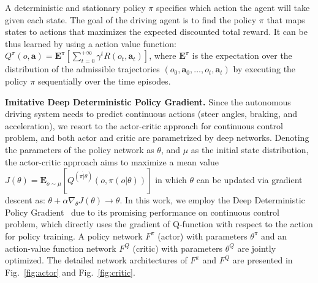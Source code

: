\documentclass[runningheads]{llncs}
\begin{document}
A deterministic and stationary policy $\pi$ specifies which action the agent will take given each state. The goal of the driving agent is to find the policy $\pi$ that maps states to actions that maximizes the expected discounted total reward. It can be thus learned by using a action value function: $Q^\pi(o,\mathbf{a}) = \mathbf{E}^\pi[\sum_{t=0}^{+\infty}\gamma^tR(o_t, \mathbf{a}_t)]$, where $\mathbf{E}^\pi$ is the expectation over the distribution of the admissible trajectories $(o_0, \mathbf{a}_0, \dots, o_t, \mathbf{a}_t)$ by executing the policy $\pi$ sequentially over the time episodes.

\noindent\textbf{Imitative Deep Deterministic Policy Gradient.} Since the autonomous driving system needs to predict continuous actions (steer angles, braking, and acceleration), we resort to the actor-critic approach for continuous control problem, and both actor and critic are parametrized by deep networks. Denoting the parameters of the policy network as $\theta$, and $\mu$ as the initial state distribution, the actor-critic approach aims to maximize a mean value $J(\theta) =\mathbf{E}_{o\sim \mu}[Q^{(\pi\dot|\theta)}(o,\pi(o|\theta))]$ in which $\theta$ can be updated via gradient descent as: $\theta + \alpha\nabla_\theta J(\theta)\rightarrow \theta$. In this work, we employ the Deep Deterministic Policy Gradient~\cite{lillicrap2015continuous} due to its promising performance on continuous control problem, which directly uses the gradient of Q-function with respect to the action for policy training. A policy network $F^\pi$ (actor) with parameters $\theta^\pi$ and an action-value function network $F^Q$ (critic) with parameters $\theta^Q$ are jointly optimized. The detailed network architectures of $F^\pi$ and $F^Q$ are presented in Fig.~\ref{fig:actor} and Fig.~\ref{fig:critic}.   
    
\end{document}
